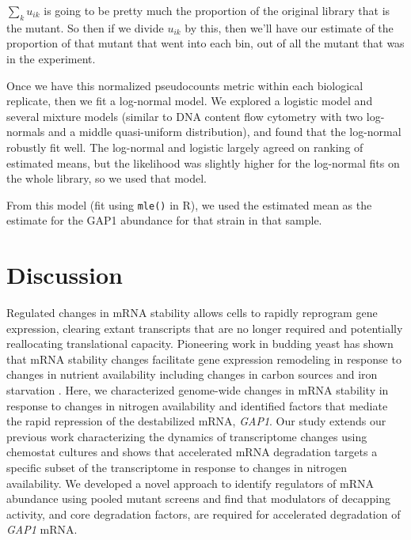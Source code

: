 {\(\sum_k u_{ik}\) is going to be pretty much the proportion of the
original library that is the mutant. So then if we divide \(u_{ik}\) by
this, then we'll have our estimate of the proportion of that mutant that
went into each bin, out of all the mutant that was in the experiment.

Once we have this normalized pseudocounts metric within each biological
replicate, then we fit a log-normal model. We explored a logistic model
and several mixture models (similar to DNA content flow cytometry with
two log-normals and a middle quasi-uniform distribution), and found that
the log-normal robustly fit well. The log-normal and logistic largely
agreed on ranking of estimated means, but the likelihood was slightly
higher for the log-normal fits on the whole library, so we used that
model.

From this model (fit using \texttt{mle()} in R), we used the estimated
mean as the estimate for the GAP1 abundance for that strain in that
sample.



\section{Discussion}

Regulated changes in mRNA stability allows cells to rapidly reprogram
gene expression, clearing extant transcripts that are no longer
required and potentially reallocating translational capacity.
Pioneering work in budding yeast has shown that mRNA
stability changes facilitate gene expression remodeling in response to
changes in nutrient availability including changes in carbon sources
\parencite{scheffler1998control} and iron starvation
\parencite{puig2005coordinated}. 
Here, we characterized genome-wide changes
in mRNA stability in response to changes in nitrogen availability and
identified factors that mediate the rapid repression of the
destabilized mRNA, \textit{GAP1}. Our study extends our previous work
characterizing the dynamics of transcriptome changes using chemostat
cultures \parencite{airoldi2016steady} and shows that accelerated mRNA
degradation targets a specific subset of the transcriptome in response
to changes in nitrogen availability. We developed a novel approach to
identify regulators of mRNA abundance using pooled mutant screens and
find that modulators of decapping activity, and core degradation
factors, are required for accelerated degradation of 
\textit{GAP1} mRNA. 
 
}
